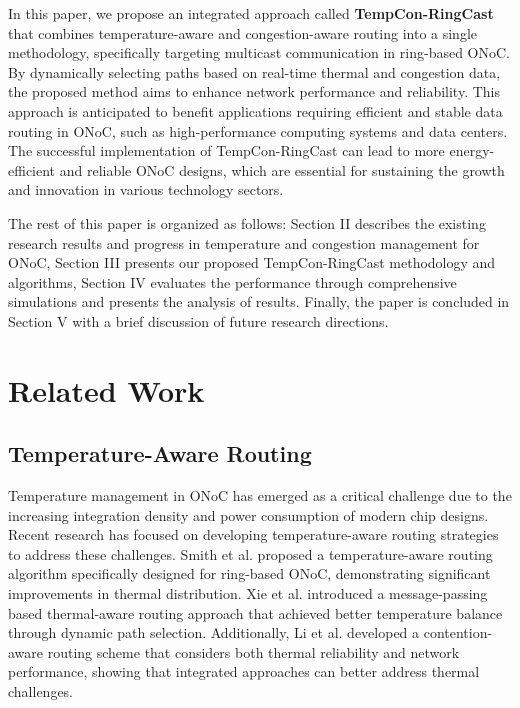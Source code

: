 \documentclass[conference]{IEEEtran}
\begin{document}
In this paper, we propose an integrated approach called \textbf{TempCon-RingCast} that combines temperature-aware and congestion-aware routing into a single methodology, specifically targeting multicast communication in ring-based ONoC. By dynamically selecting paths based on real-time thermal and congestion data, the proposed method aims to enhance network performance and reliability. This approach is anticipated to benefit applications requiring efficient and stable data routing in ONoC, such as high-performance computing systems and data centers. The successful implementation of TempCon-RingCast can lead to more energy-efficient and reliable ONoC designs, which are essential for sustaining the growth and innovation in various technology sectors.

The rest of this paper is organized as follows: Section II describes the existing research results and progress in temperature and congestion management for ONoC, Section III presents our proposed TempCon-RingCast methodology and algorithms, Section IV evaluates the performance through comprehensive simulations and presents the analysis of results. Finally, the paper is concluded in Section V with a brief discussion of future research directions.

\section{Related Work}

\subsection{Temperature-Aware Routing}
Temperature management in ONoC has emerged as a critical challenge due to the increasing integration density and power consumption of modern chip designs. Recent research has focused on developing temperature-aware routing strategies to address these challenges. Smith et al. \cite{smith2020temperature} proposed a temperature-aware routing algorithm specifically designed for ring-based ONoC, demonstrating significant improvements in thermal distribution. Xie et al. \cite{xie2020thermal} introduced a message-passing based thermal-aware routing approach that achieved better temperature balance through dynamic path selection. Additionally, Li et al. \cite{li2021contention} developed a contention-aware routing scheme that considers both thermal reliability and network performance, showing that integrated approaches can better address thermal challenges.
\end{document}
